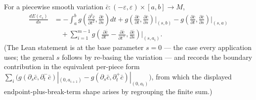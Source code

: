 \begin{lemma}
  \label{lem:pet-ch5-first-variation-formula}
  \leanok
  For a piecewise smooth variation $\bar c:(-\varepsilon,\varepsilon)\times[a,b]\to M$,
  \begin{align*}
    \frac{dE(c_s)}{ds}
    &=-\int_a^bg\!\left(\frac{\partial^2\bar c}{\partial t^2},\frac{\partial\bar c}{\partial s}\right)dt
    +g\!\left(\frac{\partial\bar c}{\partial t},\frac{\partial\bar c}{\partial s}\right)\Big|_{(s,b)}
    -g\!\left(\frac{\partial\bar c}{\partial t},\frac{\partial\bar c}{\partial s}\right)\Big|_{(s,a)}\\
    &\quad+\sum_{i=1}^{m-1}g\!\left(\frac{\partial\bar c}{\partial t^-}-\frac{\partial\bar c}{\partial t^+},
      \frac{\partial\bar c}{\partial s}\right)\Big|_{(s,a_i)}.
  \end{align*}
  (The Lean statement is at the base parameter $s=0$ --- the case every
  application uses; the general $s$ follows by re-basing the variation --- and
  records the boundary contribution in the equivalent per-piece form
  $\sum_i\big(g(\partial_s\bar c,\partial_t^-\bar c)|_{(0,a_{i+1})}
  -g(\partial_s\bar c,\partial_t^+\bar c)|_{(0,a_i)}\big)$, from which the
  displayed endpoint-plus-break-term shape arises by regrouping the finite
  sum.)
\end{lemma}
